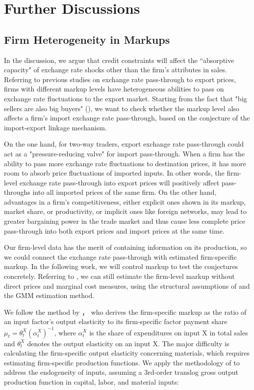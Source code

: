 \documentclass[12pt]{article}
\begin{document}
\section{Further Discussions} \label{Discussion}

\subsection{Firm Heterogeneity in Markups}

In the discussion, we argue that credit constraints will affect the ``absorptive capacity" of exchange rate shocks other than the firm's attributes in sales. Referring to previous studies on exchange rate pass-through to export prices, firms with different markup levels have heterogeneous abilities to pass on exchange rate fluctuations to the export market. Starting from the fact that "big sellers are also big buyers" (\cite{aik2014}), we want to check whether the markup level also affects a firm's import exchange rate pass-through, based on the conjecture of the import-export linkage mechanism.

On the one hand, for two-way traders, export exchange rate pass-through could act as a "pressure-reducing valve" for import pass-through. When a firm has the ability to pass more exchange rate fluctuations to destination prices, it has more room to absorb price fluctuations of imported inputs. In other words, the firm-level exchange rate pass-through into export prices will positively affect pass-throughs into all imported prices of the same firm. On the other hand, advantages in a firm's competitiveness, either explicit ones shown in its markup, market share, or productivity, or implicit ones like foreign networks, may lead to greater bargaining power in the trade market and thus cause less complete price pass-through into both export prices and import prices at the same time.

Our firm-level data has the merit of containing information on its production, so we could connect the exchange rate pass-through with estimated firm-specific markup. In the following work, we will control markup to test the conjectures concretely. Referring to \cite{bkl2021}, we can still estimate the firm-level markup without direct prices and marginal cost measures, using the structural assumptions of \cite{dlw2012} and the GMM estimation method.

We follow the method by \cite{dlw2012}， who derives the firm-specific markup as the ratio of an input factor's output elasticity to its firm-specific factor payment share $\mu_{t}=\theta_{t}^{X}\left(\alpha_{t}^{X}\right)^{-1}$, where $\alpha_{t}^{X}$ is the share of expenditures on input X in total sales and $\theta^X_t$ denotes the output elasticity on an input X. The major difficulty is calculating the firm-specific output elasticity concerning materials, which requires estimating firm-specific production functions. We apply the methodology of \cite{acf2015} to address the endogeneity of inputs, assuming a 3rd-order translog gross output production function in capital, labor, and material inputs:
\end{document}

